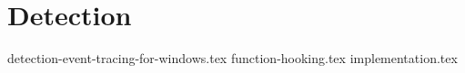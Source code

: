 \documentclass{report}
\begin{document}
\chapter{Detection}
\label{cha:detection}
{detection-event-tracing-for-windows.tex}
{function-hooking.tex}
{implementation.tex}
\end{document}
